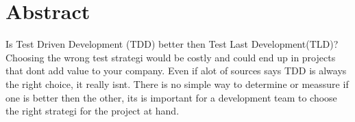 \section*{Abstract}
\label{section:abstract}
Is Test Driven Development (TDD) better then Test Last Development(TLD)?
Choosing the wrong test strategi would be costly and could end up in projects that dont add value to your company.
Even if alot of sources says TDD is always the right choice, it really isnt.
There is no simple way to determine or meassure if one is better then the other,
 its is important for a development team to choose the right strategi for the project at hand.


